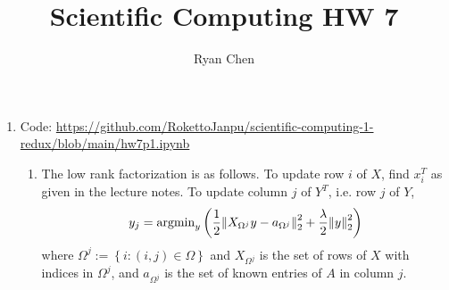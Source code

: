 \documentclass{article}
\title{Scientific Computing HW 7}
\author{Ryan Chen}
\newcommand{\br}[1]{\left(#1\right)}
\newcommand{\brc}[1]{\left\{#1\right\}}
\begin{document}
	
\maketitle



\begin{enumerate}
	
	
	
	\item Code: \url{https://github.com/RokettoJanpu/scientific-computing-1-redux/blob/main/hw7p1.ipynb}
	
	\begin{enumerate}
		
		
		
		\item The low rank factorization is as follows. To update row $i$ of $X$, find $x_i^T$ as given in the lecture notes. To update column $j$ of $Y^T$, i.e. row $j$ of $Y$,
		\[y_j = \mathrm{argmin}_y\br{\frac12\norm{X_{\Omega^j}y - a_{\Omega^j}}_2^2 + \frac\lambda2\norm{y}_2^2}\]
		where $\Omega^j:=\brc{i:(i,j)\in\Omega}$ and $X_{\Omega^j}$ is the set of rows of $X$ with indices in $\Omega^j$, and $a_{\Omega^j}$ is the set of known entries of $A$ in column $j$.
		

\end{enumerate}
\end{enumerate}
\end{document}
